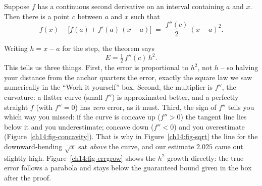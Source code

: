 \begin{theorem}
\label{ch14:thm-error}
Suppose $f$ has a continuous second derivative on an interval containing $a$ and
$x$. Then there is a point $c$ between $a$ and $x$ such that
\[
f(x) - \bigl[f(a) + f'(a)\,(x-a)\bigr] \;=\; \frac{f''(c)}{2}\,(x-a)^2.
\]
\end{theorem}

Writing $h = x-a$ for the step, the theorem says
\[
E = \tfrac12\, f''(c)\, h^2.
\]
This tells us three things. First, the error is proportional to $h^2$, not $h$ -- so
halving your distance from the anchor quarters the error, exactly the square law
we saw numerically in the ``Work it yourself'' box. Second, the multiplier is $f''$, the
curvature: a flatter curve (small $f''$) is approximated better, and a perfectly
straight $f$ (with $f''=0$) has \emph{zero} error, as it must. Third, the sign of
$f''$ tells you which way you missed: if the curve is concave up ($f''>0$) the
tangent line lies below it and you underestimate; concave down ($f''<0$) and you
overestimate (Figure~\ref{ch14:fig-concavity}). That is why in Figure~\ref{ch14:fig-sqrt} the line for the
downward-bending $\sqrt{x}$ sat \emph{above} the curve, and our estimate $2.025$
came out slightly high. Figure~\ref{ch14:fig-errgrow} shows the $h^2$ growth
directly: the true error follows a parabola and stays below the guaranteed bound
given in the box after the proof.

